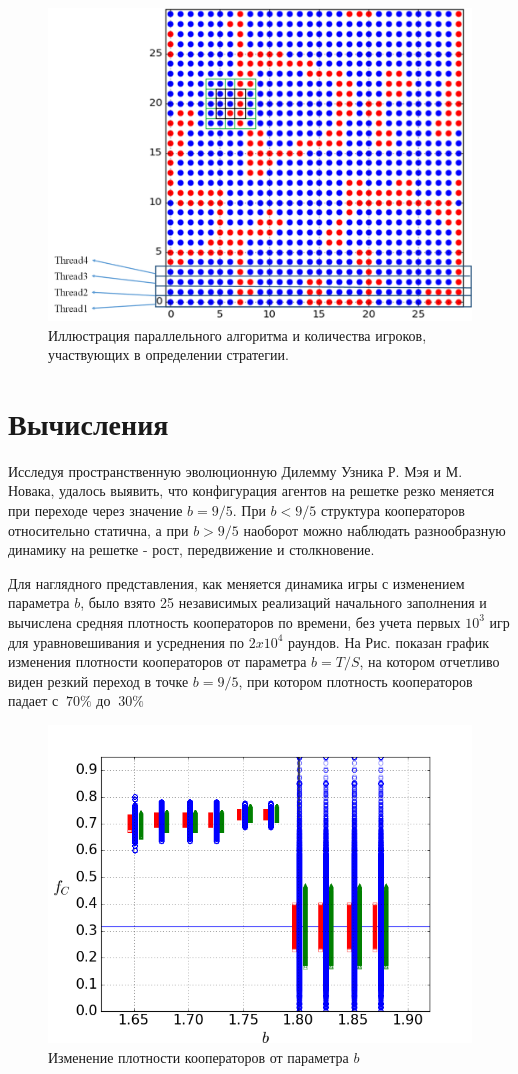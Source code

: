 \documentclass[12pt,a4paper]{article}
\begin{document}
	\begin{figure}[H]
		\label{parall}
		\centering
		\includegraphics[width=0.7\linewidth]{rule.png}
		\caption{Иллюстрация параллельного алгоритма и количества игроков, участвующих в определении стратегии.}
	\end{figure}
	
	\section{Вычисления}
	
	\par Исследуя пространственную эволюционную Дилемму Узника Р. Мэя и М. Новака, удалось выявить, что конфигурация агентов на решетке резко меняется при переходе через значение $b = 9/5$. При $b<9/5$ структура кооператоров относительно статична, а при $b>9/5$ наоборот можно наблюдать разнообразную динамику на решетке - рост, передвижение и столкновение.
	
	\par Для наглядного представления, как меняется динамика игры с изменением параметра $b$, было взято 25 независимых реализаций начального заполнения и вычислена средняя плотность кооператоров по времени, без учета первых $10^{3}$ игр для уравновешивания и усреднения по $2 x 10^{4}$ раундов. На Рис. показан график изменения плотности кооператоров от параметра $b=T/S$, на котором отчетливо виден резкий переход в точке $b=9/5$, при котором плотность кооператоров падает с $~70\% $ до $~30\%$
	
	\begin{figure}[H]
		\label{freq}
		\centering
		\includegraphics[width=0.7\linewidth]{fig1_1.png}
		\caption{Изменение плотности кооператоров от параметра $b$}
	\end{figure}
	
\end{document}
